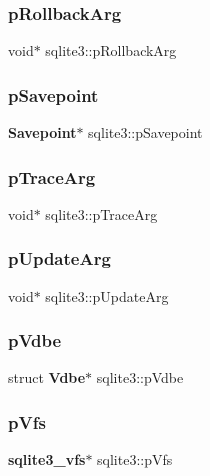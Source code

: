 \mbox{\label{structsqlite3_a3215967241f15d4599132a8dc2adfb93}} 
\subsubsection{pRollbackArg}
{\footnotesize\ttfamily void$\ast$ sqlite3\+::p\+Rollback\+Arg}

\mbox{\label{structsqlite3_a47f4fe21bba981ccd47ee7f873f48a07}} 
\subsubsection{pSavepoint}
{\footnotesize\ttfamily \textbf{ Savepoint}$\ast$ sqlite3\+::p\+Savepoint}

\mbox{\label{structsqlite3_ae0920576e4e92f1b736255fcfad649d1}} 
\subsubsection{pTraceArg}
{\footnotesize\ttfamily void$\ast$ sqlite3\+::p\+Trace\+Arg}

\mbox{\label{structsqlite3_ab4269aa44fea9906fe94045336f13d2a}} 
\subsubsection{pUpdateArg}
{\footnotesize\ttfamily void$\ast$ sqlite3\+::p\+Update\+Arg}

\mbox{\label{structsqlite3_a596f0301f43c5e25575c2a1403f8b571}} 
\subsubsection{pVdbe}
{\footnotesize\ttfamily struct \textbf{ Vdbe}$\ast$ sqlite3\+::p\+Vdbe}

\mbox{\label{structsqlite3_a8ad0bcb473e4cb492165739acff918cd}} 
\subsubsection{pVfs}
{\footnotesize\ttfamily \textbf{ sqlite3\+\_\+vfs}$\ast$ sqlite3\+::p\+Vfs}

